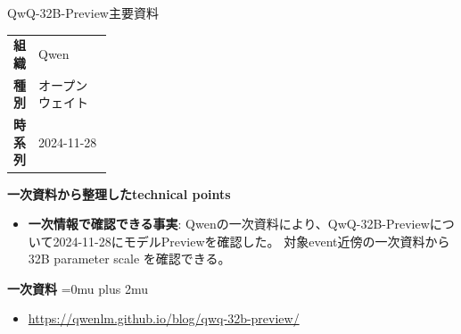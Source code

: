 \begin{technicalnote}{QwQ-32B-Preview}{主要資料}
\begingroup
\begin{tabularx}{\linewidth}{@{}>{\bfseries}p{0.22\linewidth}X@{}}
組織 & Qwen \\
種別 & オープンウェイト \\
時系列 & 2024-11-28 \\
\end{tabularx}
\smallskip
{\bfseries 一次資料から整理したtechnical points}
\begin{itemize}[leftmargin=1.5em,itemsep=0.35em]
\item \textbf{一次情報で確認できる事実}: Qwenの一次資料により、QwQ-32B-Previewについて2024-11-28にモデルPreviewを確認した。 対象event近傍の一次資料から 32B parameter scale を確認できる。
\end{itemize}
\begin{minipage}{\linewidth}
\begin{samepage}
{\bfseries 一次資料}
\begingroup\sloppy
\Urlmuskip=0mu plus 2mu\relax
\begin{itemize}[leftmargin=1.5em,itemsep=0.25em]
\item {\scriptsize\url{https://qwenlm.github.io/blog/qwq-32b-preview/}}
\end{itemize}
\endgroup
\end{samepage}
\end{minipage}
\endgroup
\end{technicalnote}
\medskip

